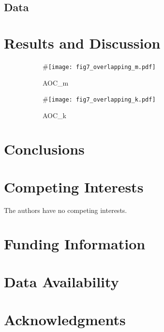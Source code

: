 \documentclass[12pt, oneside]{article}   	%
\begin{document}
\subsection{Data} 
\section{Results and Discussion}
	
\begin{figure}[H]
\centering
\begin{subfigure}[t]{0.48\textwidth}
\centering
#\texttt{[image: fig7\_overlapping\_m.pdf]}
\caption{AOC\_m}
\end{subfigure}
\hfill
\begin{subfigure}[t]{0.48\textwidth}
\centering
#\texttt{[image: fig7\_overlapping\_k.pdf]} 
\caption{AOC\_k}
\end{subfigure}
\caption{}
\label{fig:overlapping}
\end{figure}
		
\section{Conclusions}
	
\section*{Competing Interests} \vspace{3mm} The authors have no competing interests. 
	
\section*{Funding Information} 
	
\section*{Data Availability} 
	
\section*{Acknowledgments} 



\end{document}
